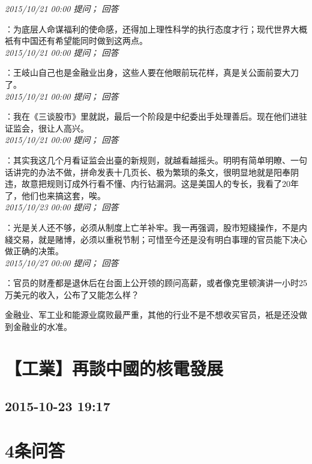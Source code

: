 \documentclass[twocolumn]{ctexart}
\begin{document}
\textit{\hfill\noindent\small 2015/10/21 00:00 提问； 回答}

：为底层人命谋福利的使命感，还得加上理性科学的执行态度才行；现代世界大概衹有中国还有希望能同时做到这两点。\\

\textit{\hfill\noindent\small 2015/10/21 00:00 提问； 回答}

：王岐山自己也是金融业出身，这些人要在他眼前玩花样，真是关公面前耍大刀了。\\

\textit{\hfill\noindent\small 2015/10/21 00:00 提问； 回答}

：我在《三谈股市》里就説，最后一个阶段是中纪委出手处理善后。现在他们进驻证监会，很让人高兴。\\

\textit{\hfill\noindent\small 2015/10/21 00:00 提问； 回答}

：其实我这几个月看证监会出臺的新规则，就越看越摇头。明明有简单明瞭、一句话讲完的办法不做，拼命发表十几页长、极为繁琐的条文，很明显地就是阳奉阴违，故意把规则订成外行看不懂、内行钻漏洞。这是美国人的专长，我看了20年了，他们也来搞这套，唉。\\

\textit{\hfill\noindent\small 2015/10/23 00:00 提问； 回答}

：光是关人还不够，必须从制度上亡羊补牢。我一再强调，股市短綫操作，不是内綫交易，就是赌博，必须以重税节制；可惜至今还是没有明白事理的官员能下决心做正确的决策。\\

\textit{\hfill\noindent\small 2015/10/27 00:00 提问； 回答}

：官员的财產都是退休后在台面上公开领的顾问高薪，或者像克里顿演讲一小时25万美元的收入，公布了又能怎么样？

金融业、军工业和能源业腐败最严重，其他的行业不是不想收买官员，衹是还没做到金融业的水准。\\


\section{【工業】再談中國的核電發展}
\subsection{2015-10-23 19:17}


\section{4条问答}
\end{document}
